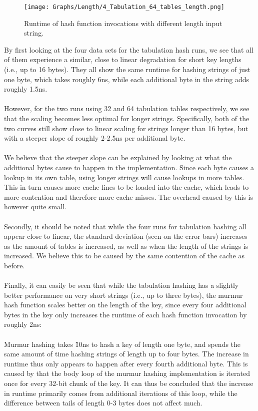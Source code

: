 \documentclass[11pt]{report} %
\begin{document}
\begin{figure}[H]
  \centering
  \texttt{[image: Graphs/Length/4\_Tabulation\_64\_tables\_length.png]}\\
  \caption{Runtime of hash function invocations with different length input string.}\label{fig:key_length}
\end{figure}
\noindent
By first looking at the four data sets for the tabulation hash runs, we see that all of them experience a similar, close to linear degradation for short key lengths (i.e., up to 16 bytes). They all show the same runtime for hashing strings of just one byte, which takes roughly 6ns, while each additional byte in the string adds roughly 1.5ns.\\
\\
However, for the two runs using 32 and 64 tabulation tables respectively, we see that the scaling becomes less optimal for longer strings. Specifically, both of the two curves still show close to linear scaling for strings longer than 16 bytes, but with a steeper slope of roughly 2-2.5ns per additional byte. \\
\\
We believe that the steeper slope can be explained by looking at what the additional bytes cause to happen in the implementation. Since each byte causes a lookup in its own table, using longer strings will cause lookups in more tables. This in turn causes more cache lines to be loaded into the cache, which leads to more contention and therefore more cache misses. The overhead caused by this is however quite small.\\
\\
Secondly, it should be noted that while the four runs for tabulation hashing all appear close to linear, the standard deviation (seen on the error bars) increases as the amount of tables is increased, as well as when the length of the strings is increased. We believe this to be caused by the same contention of the cache as before.\\
\\
Finally, it can easily be seen that while the tabulation hashing has a slightly better performance on very short strings (i.e., up to three bytes), the murmur hash function scales better on the length of the key, since every four additional bytes in the key only increases the runtime of each hash function invocation by roughly 2ns: \\
\\
Murmur hashing takes \~10ns to hash a key of length one byte, and spends the same amount of time hashing strings of length up to four bytes. The increase in runtime thus only appears to happen after every fourth additional byte. This is caused by that the body loop of the murmur hashing implementation is iterated once for every 32-bit chunk of the key. It can thus be concluded that the increase in runtime primarily comes from additional iterations of this loop, while the difference between tails of length 0-3 bytes does not affect much.
\end{document}
